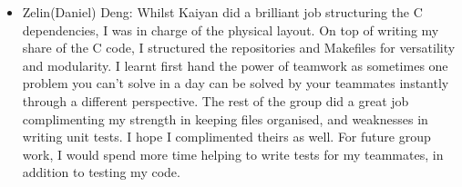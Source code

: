 \documentclass[11pt]{article}
\begin{document}
\begin{itemize}
    \item Zelin(Daniel) Deng: Whilst Kaiyan did a brilliant job structuring the C dependencies, I was in charge of the physical layout. On top of writing my share of the C code, I structured the repositories and Makefiles for versatility and modularity. I learnt first hand the power of teamwork as sometimes one problem you can't solve in a day can be solved by your teammates instantly through a different perspective. The rest of the group did a great job complimenting my strength in keeping files organised, and weaknesses in writing unit tests. I hope I complimented theirs as well. For future group work, I would spend more time helping to write tests for my teammates, in addition to testing my code.  
\end{itemize}


\printbibliography
\end{document}
